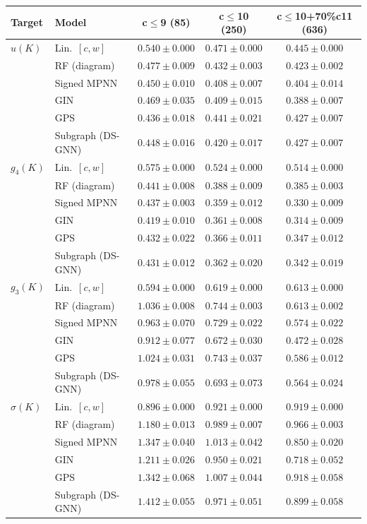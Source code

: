 \begin{tabular}{l l ccc}
\toprule
Target & Model & c$\le$9 (85) & c$\le$10 (250) & c$\le$10+70\%c11 (636)\\
\midrule
$u(K)$ & Lin.\ $[c,w]$ & $0.540\pm0.000$ & $0.471\pm0.000$ & $0.445\pm0.000$\\
 & RF (diagram) & $0.477\pm0.009$ & $0.432\pm0.003$ & $0.423\pm0.002$\\
 & Signed MPNN & $0.450\pm0.010$ & $0.408\pm0.007$ & $0.404\pm0.014$\\
 & GIN & $0.469\pm0.035$ & $0.409\pm0.015$ & $0.388\pm0.007$\\
 & GPS & $0.436\pm0.018$ & $0.441\pm0.021$ & $0.427\pm0.007$\\
 & Subgraph (DS-GNN) & $0.448\pm0.016$ & $0.420\pm0.017$ & $0.427\pm0.007$\\
\midrule
$g_4(K)$ & Lin.\ $[c,w]$ & $0.575\pm0.000$ & $0.524\pm0.000$ & $0.514\pm0.000$\\
 & RF (diagram) & $0.441\pm0.008$ & $0.388\pm0.009$ & $0.385\pm0.003$\\
 & Signed MPNN & $0.437\pm0.003$ & $0.359\pm0.012$ & $0.330\pm0.009$\\
 & GIN & $0.419\pm0.010$ & $0.361\pm0.008$ & $0.314\pm0.009$\\
 & GPS & $0.432\pm0.022$ & $0.366\pm0.011$ & $0.347\pm0.012$\\
 & Subgraph (DS-GNN) & $0.431\pm0.012$ & $0.362\pm0.020$ & $0.342\pm0.019$\\
\midrule
$g_3(K)$ & Lin.\ $[c,w]$ & $0.594\pm0.000$ & $0.619\pm0.000$ & $0.613\pm0.000$\\
 & RF (diagram) & $1.036\pm0.008$ & $0.744\pm0.003$ & $0.613\pm0.002$\\
 & Signed MPNN & $0.963\pm0.070$ & $0.729\pm0.022$ & $0.574\pm0.022$\\
 & GIN & $0.912\pm0.077$ & $0.672\pm0.030$ & $0.472\pm0.028$\\
 & GPS & $1.024\pm0.031$ & $0.743\pm0.037$ & $0.586\pm0.012$\\
 & Subgraph (DS-GNN) & $0.978\pm0.055$ & $0.693\pm0.073$ & $0.564\pm0.024$\\
\midrule
$\sigma(K)$ & Lin.\ $[c,w]$ & $0.896\pm0.000$ & $0.921\pm0.000$ & $0.919\pm0.000$\\
 & RF (diagram) & $1.180\pm0.013$ & $0.989\pm0.007$ & $0.966\pm0.003$\\
 & Signed MPNN & $1.347\pm0.040$ & $1.013\pm0.042$ & $0.850\pm0.020$\\
 & GIN & $1.211\pm0.026$ & $0.950\pm0.021$ & $0.718\pm0.052$\\
 & GPS & $1.342\pm0.068$ & $1.007\pm0.044$ & $0.918\pm0.058$\\
 & Subgraph (DS-GNN) & $1.412\pm0.055$ & $0.971\pm0.051$ & $0.899\pm0.058$\\

\bottomrule
\end{tabular}
